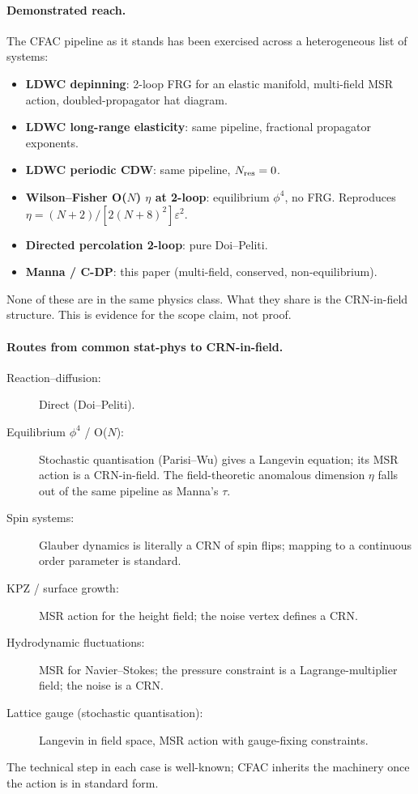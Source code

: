 \documentclass[10pt,a4paper,twocolumn]{article}
\theoremstyle{plain}
\theoremstyle{definition}
\newcommand{\eps}{\varepsilon}
\newcommand{\Nres}{N_{\rm res}}
\begin{document}
\paragraph{Demonstrated reach.}
The CFAC pipeline as it stands has been exercised across a
heterogeneous list of systems:
\begin{itemize}[leftmargin=1.2em,itemsep=1pt]
  \item \textbf{LDWC depinning}: 2-loop FRG for an elastic manifold,
    multi-field MSR action, doubled-propagator hat
    diagram.~\citep{Amarteifio2026LDWC}
  \item \textbf{LDWC long-range elasticity}: same pipeline,
    fractional propagator exponents.
  \item \textbf{LDWC periodic CDW}: same pipeline, $\Nres = 0$.
  \item \textbf{Wilson--Fisher O($N$) $\eta$ at 2-loop}: equilibrium
    $\phi^4$, no FRG.  Reproduces $\eta = (N{+}2)/[2(N{+}8)^2]\eps^2$.
  \item \textbf{Directed percolation 2-loop}: pure
    Doi--Peliti.~\citep{Amarteifio2026TwoLoop}
  \item \textbf{Manna / C-DP}: this paper (multi-field, conserved,
    non-equilibrium).
\end{itemize}
None of these are in the same physics class.  What they share is
the CRN-in-field structure.  This is evidence for the scope claim,
not proof.

\paragraph{Routes from common stat-phys to CRN-in-field.}
\begin{description}
  \item[Reaction--diffusion:] Direct (Doi--Peliti).
  \item[Equilibrium $\phi^4$ / O($N$):] Stochastic quantisation
    (Parisi--Wu) gives a Langevin equation; its MSR action is a
    CRN-in-field.  The field-theoretic anomalous dimension $\eta$
    falls out of the same pipeline as Manna's $\tau$.
  \item[Spin systems:] Glauber dynamics is literally a CRN of
    spin flips; mapping to a continuous order parameter is standard.
  \item[KPZ / surface growth:] MSR action for the height field;
    the noise vertex defines a CRN.
  \item[Hydrodynamic fluctuations:] MSR for Navier--Stokes; the
    pressure constraint is a Lagrange-multiplier field; the noise
    is a CRN.
  \item[Lattice gauge (stochastic quantisation):] Langevin in field
    space, MSR action with gauge-fixing constraints.
\end{description}
The technical step in each case is well-known; CFAC inherits the
machinery once the action is in standard form.
\end{document}
